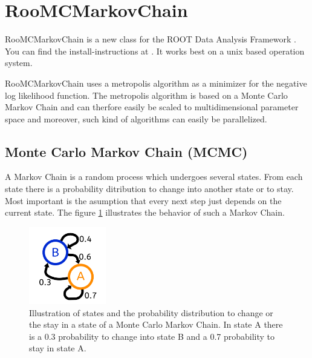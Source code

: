 \documentclass[english]{uzhpub}
\begin{document}










%


\section{RooMCMarkovChain} \label{sec:RooMCMC}
RooMCMarkovChain is a new class for the ROOT Data Analysis Framework \cite{bib:root}. You can find the install-instructions at \cite{bib:root}. It works best on a unix based operation system.

 RooMCMarkovChain uses a metropolis algorithm as a minimizer for the negative log likelihood function. The metropolis algorithm is based on a Monte Carlo Markov Chain and can therfore easily be scaled to multidimensional parameter space and moreover, such kind of algorithms can easily be parallelized.

\subsection{Monte Carlo Markov Chain (MCMC)}  \label{sec:MCMC}
A Markov Chain is a random process which undergoes several states. From each state there is a probability ditribution to change into another state or to stay. Most important is the asumption that every next step just depends on the current state.
The figure \ref{fig:MCMC} illustrates the behavior of such a Markov Chain.

\begin{figure}[H]
  \centering
  \includegraphics[width=0.3\textwidth]{MCMC_Chain}
  \caption{Illustration of states and the probability distribution to change or the stay in a state of a Monte Carlo Markov Chain. In state A there is a 0.3 probability to change into state B and a 0.7 probability to stay in state A.}
  \label{fig:MCMC}
\end{figure}
\end{document}

